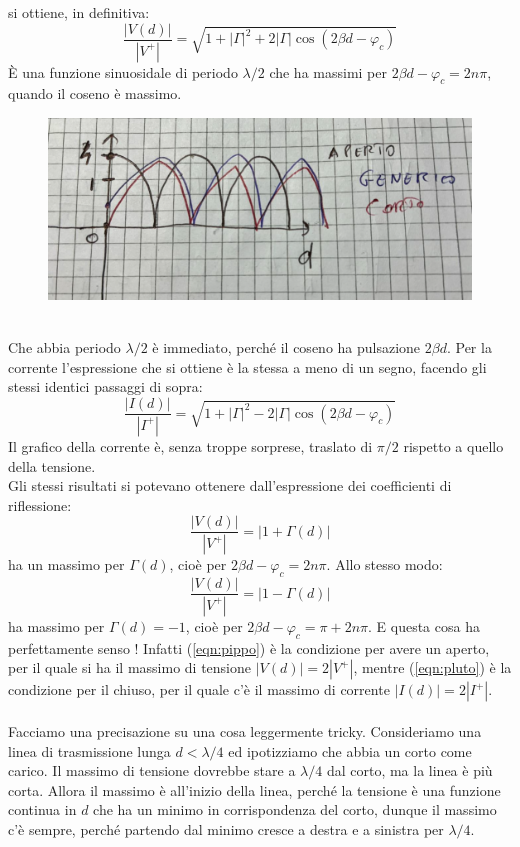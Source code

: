 \documentclass{book}
\begin{document}
    si ottiene, in definitiva:
    \begin{equation}
        \frac{|V(d)|}{|V^{+}|} = \sqrt{1 + |\Gamma|^{2}+2|\Gamma|\cos(2 \beta d- \varphi_{c})}
    \end{equation}
    È una funzione sinuosidale di periodo $\lambda/2$ che ha massimi per $2\beta d - \varphi_{c} = 2n \pi$, quando il coseno è massimo. 
    \begin{figure}[h!]
        \center  
        \includegraphics[width=0.65\linewidth]{Chapter_two/Chapt2img14.png}
    \end{figure}
    \\
    Che abbia periodo $\lambda/2$ è immediato, perché il coseno ha pulsazione $2 \beta d$.
    Per la corrente l'espressione che si ottiene è la stessa a meno di un segno, facendo gli stessi identici 
    passaggi di sopra:
    \begin{equation}
        \frac{|I(d)|}{|I^{+}|} = \sqrt{1+|\Gamma|^{2}-2|\Gamma|\cos(2 \beta d - \varphi_{c})}
    \end{equation}
    Il grafico della corrente è, senza troppe sorprese, traslato di $\pi/2$ rispetto a quello della tensione. \\
    Gli stessi risultati si potevano ottenere dall'espressione dei coefficienti di riflessione:
    \begin{equation}
        \label{eqn:pippo}
        \frac{|V(d)|}{|V^{+}|}=|1+\Gamma(d)|
    \end{equation}
    ha un massimo per $\Gamma(d)$, cioè per $2\beta d-\varphi_{c} = 2n \pi$. Allo stesso modo:
    \begin{equation}
        \label{eqn:pluto}
        \frac{|V(d)|}{|V^{+}|}=|1-\Gamma(d)|
    \end{equation}
    ha massimo per $\Gamma(d) = -1$, cioè per $2\beta d-\varphi_{c} = \pi + 2n \pi$. 
    E questa cosa ha perfettamente senso ! Infatti (\ref{eqn:pippo}) è la condizione per avere un aperto, 
    per il quale si ha il massimo di tensione $|V(d)|=2|V^{+}|$, mentre (\ref{eqn:pluto}) è la condizione per il chiuso,
    per il quale c'è il massimo di corrente $|I(d)|=2|I^{+}|$. \\ \\
    Facciamo una precisazione su una cosa leggermente tricky. Consideriamo una linea di trasmissione lunga 
    $d < \lambda/4$ ed ipotizziamo che abbia un corto come carico. Il massimo di tensione dovrebbe stare a $\lambda/4$ dal corto,
    ma la linea è più corta. Allora il massimo è all'inizio della linea, perché la tensione è una funzione continua in $d$ che ha un 
    minimo in corrispondenza del corto, dunque il massimo c'è sempre, perché partendo dal minimo cresce a destra e a sinistra per $\lambda/4$. 
    
\end{document}
